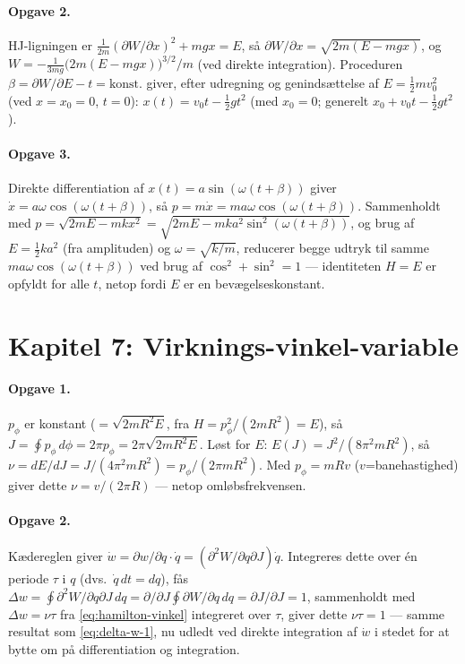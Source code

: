 \paragraph{Opgave 2.} HJ-ligningen er
$\frac{1}{2m}(\partial W/\partial x)^2+mgx=E$, så
$\partial W/\partial x=\sqrt{2m(E-mgx)}$, og
$W=-\frac{1}{3mg}\bigl(2m(E-mgx)\bigr)^{3/2}\big/m$ (ved direkte
integration). Proceduren
$\beta=\partial W/\partial E-t=\text{konst.}$ giver, efter
udregning og genindsættelse af $E=\frac12mv_0^2$ (ved $x=x_0=0$, $t=0$):
$x(t)=v_0t-\frac12gt^2$ (med $x_0=0$; generelt $x_0+v_0t-\frac12gt^2$).

\paragraph{Opgave 3.} Direkte differentiation af
$x(t)=a\sin(\omega(t+\beta))$ giver
$\dot x=a\omega\cos(\omega(t+\beta))$, så
$p=m\dot x=ma\omega\cos(\omega(t+\beta))$. Sammenholdt med
$p=\sqrt{2mE-mkx^2}=\sqrt{2mE-mka^2\sin^2(\omega(t+\beta))}$, og brug
af $E=\frac12ka^2$ (fra amplituden) og $\omega=\sqrt{k/m}$, reducerer
begge udtryk til samme $ma\omega\cos(\omega(t+\beta))$ ved brug af
$\cos^2+\sin^2=1$ — identiteten $H=E$ er opfyldt for alle $t$, netop
fordi $E$ er en bevægelseskonstant.

\section*{Kapitel 7: Virknings-vinkel-variable}

\paragraph{Opgave 1.} $p_\phi$ er konstant ($=\sqrt{2mR^2E}$, fra
$H=p_\phi^2/(2mR^2)=E$), så $J=\oint p_\phi\,d\phi=2\pi p_\phi=2\pi\sqrt{2mR^2E}$.
Løst for $E$: $E(J)=J^2/(8\pi^2mR^2)$, så
$\nu=dE/dJ=J/(4\pi^2mR^2)=p_\phi/(2\pi mR^2)$. Med $p_\phi=mRv$
($v$=banehastighed) giver dette $\nu=v/(2\pi R)$ — netop
omløbsfrekvensen.

\paragraph{Opgave 2.} Kædereglen giver
$\dot w=\partial w/\partial q\cdot\dot q=(\partial^2W/\partial q\partial J)\dot q$.
Integreres dette over én periode $\tau$ i $q$ (dvs.\ $\dot q\,dt=dq$),
fås $\Delta w=\oint\partial^2W/\partial q\partial J\,dq
=\partial/\partial J\oint\partial W/\partial q\,dq=\partial J/\partial J=1$,
sammenholdt med $\Delta w=\nu\tau$ fra \eqref{eq:hamilton-vinkel}
integreret over $\tau$, giver dette $\nu\tau=1$ — samme resultat som
\eqref{eq:delta-w-1}, nu udledt ved direkte integration af $\dot w$ i
stedet for at bytte om på differentiation og integration.

